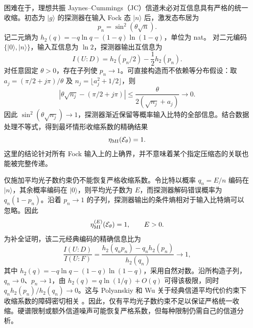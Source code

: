 \documentclass[UTF8,11pt,a4paper,fontset=none]{ctexart}
\begin{document}
困难在于，理想共振 Jaynes--Cummings（JC）信道未必对互信息具有严格的统一收缩。初态为 $|g\rangle$ 的探测器在输入 Fock 态 $|n\rangle$ 后，激发态布居为
\begin{equation}
p_n=\sin^2(\theta\sqrt n).
\label{eq:jc-channel-fock-outputs}
\end{equation}
记二元熵为 $h_2(q)=-q\ln q-(1-q)\ln(1-q)$，单位为 nat。
对二元编码 $\{|0\rangle,|n\rangle\}$，输入互信息为 $\ln2$，探测器输出互信息为
\begin{equation}
I(U:D)=h_2(p_n/2)-\frac12h_2(p_n).
\label{eq:jc-fock-code-mi}
\end{equation}
对任意固定 $\theta>0$，存在子列使 $p_n\to1$。可直接构造而不依赖等分布假设：取 $a_j=(\pi/2+j\pi)/\theta$ 及 $n_j=\lfloor a_j^2+1/2\rfloor$，则
\begin{equation}
|\theta\sqrt{n_j}-(\pi/2+j\pi)|
\leq\frac{\theta}{2(\sqrt{n_j}+a_j)}\longrightarrow0.
\end{equation}
因此 $\sin^2(\theta\sqrt{n_j})\to1$，探测器渐近保留等概率输入比特的全部信息。结合数据处理不等式，得到最坏情形收缩系数的精确结果
\begin{equation}
\eta_{\rm MI}(\mathcal E_\theta)=1.
\label{eq:jc-uniform-coefficient-one}
\end{equation}
这里的结论针对所有 Fock 输入上的上确界，并不意味着某个指定压缩态的关联也能被完整传递。

仅施加平均光子数约束仍不能恢复严格收缩系数。令比特以概率 $q_n=E/n$ 编码在 $|n\rangle$，其余概率编码在 $|0\rangle$，则平均光子数为 $E$，而探测器解码错误概率为 $q_n(1-p_n)$。沿着 $p_n\to1$ 的子列，探测器输出的条件熵相对于输入比特熵可以忽略。因此
\begin{equation}
\eta_{\rm MI}^{(E)}(\mathcal E_\theta)=1,\qquad E>0.
\label{eq:average-energy-mi-coefficient-one}
\end{equation}
为补全证明，该二元经典编码的精确信息比为
\begin{equation}
\frac{I(U:D)}{I(U:F)}
=\frac{h_2(q_np_n)-q_nh_2(p_n)}{h_2(q_n)}\longrightarrow1,
\label{eq:rare-code-information-ratio}
\end{equation}
其中 $h_2(q)=-q\ln q-(1-q)\ln(1-q)$，采用自然对数。沿所构造子列，$q_n\to0$、$p_n\to1$，由 $h_2(q)=q\ln(1/q)+O(q)$ 可得该极限，同时 $q_nh_2(p_n)/h_2(q_n)\to0$。这与 Polyanskiy 和 Wu 关于经典信道平均代价约束下收缩系数的障碍密切相关 \cite{PolyanskiyWu2016Dissipation}。因此，仅有平均光子数约束不足以保证严格统一收缩。硬谱限制或额外信道噪声可能恢复严格系数，但每种限制仍需自己的信道分析。
\end{document}
